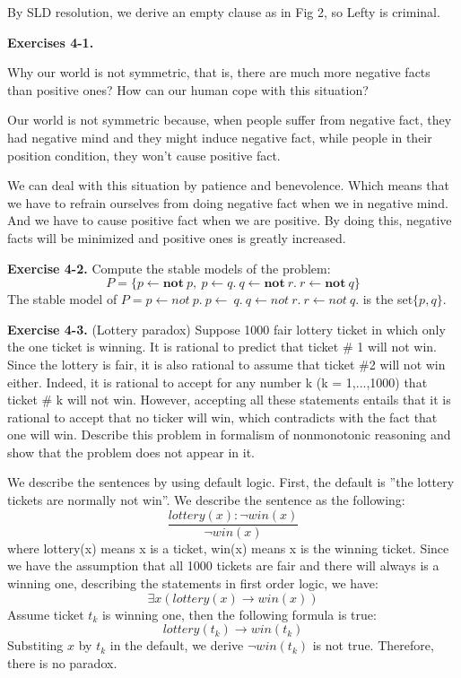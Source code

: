 \documentclass[12pt,twoside]{article}
\begin{document}
\begin{exercises}
By SLD resolution, we derive an empty clause as in Fig 2, so Lefty is criminal. 
\fi

\textbf{Exercises 4-1.}

Why our world is not symmetric, that is, there are much more negative facts than positive ones? How can our human cope with this situation?

Our world is not symmetric because, when people suffer from negative fact, they had negative mind and they might induce negative fact, while people in their position condition, they won't cause positive fact.

We can deal with this situation by patience and benevolence. Which means that we have to refrain ourselves from doing negative fact when we in negative mind. And we have to cause positive fact when we are positive. By doing this, negative facts will be minimized and positive ones is greatly increased.

\textbf{Exercise 4-2.}
Compute the stable models of the problem:
$$P = \{p \leftarrow \textbf{not} \ p, \ p \leftarrow q. \ q \leftarrow \textbf{not} \ r. \ r \leftarrow \textbf{not} \ q \}$$
\ifsolution \solution{}
The stable model of $P = {p \leftarrow not \ p. \ p \leftarrow \ q. \ q \leftarrow not \ r. \ r \leftarrow not \ q.}$ is the set$\{p,q\}$. 
\fi

\textbf{Exercise 4-3.}
(Lottery paradox) Suppose 1000 fair lottery ticket in which only the one ticket is winning. It is rational to predict that ticket $\#$ 1 will not win. Since the lottery is fair, it is also rational to assume that ticket $\#$2 will not win either. Indeed, it is rational to accept for any number k (k = 1,...,1000) that ticket $\#$ k will not win. However, accepting all these statements entails that it is rational to accept that no ticker will win, which contradicts with the fact that one will win. Describe this problem in formalism of nonmonotonic reasoning and show that the problem does not appear in it.

\ifsolution \solution{}
We describe the sentences by using default logic. First, the default is ''the lottery tickets are normally not win''. We describe the sentence as the following:
$$\frac{lottery(x): \neg win(x)}{\neg win(x)}$$
where lottery(x) means x is a ticket, win(x) means x is the winning ticket. Since we have the assumption that all 1000 tickets are fair and there will always is a winning one, describing the statements in first order logic, we have:
$$\exists x(lottery(x) \rightarrow win(x))$$
Assume ticket $t_k$ is winning one, then the following formula is true:
$$lottery(t_k) \rightarrow win(t_k)$$
Substiting $x$ by $t_k$ in the default, we derive $\neg win(t_k)$ is not true. Therefore, there is no paradox.
\fi


\end{exercises}
\end{document}
